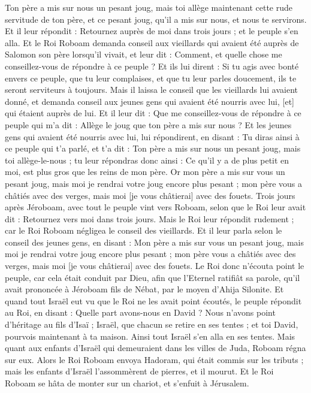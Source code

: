 \begin{multicols}{2}
Ton père a mis sur nous un pesant joug, mais toi allège maintenant cette rude servitude de ton père, et ce pesant joug, qu'il a mis sur nous, et nous te servirons.
Et il leur répondit : Retournez auprès de moi dans trois jours ; et le peuple s'en alla.
Et le Roi Roboam demanda conseil aux vieillards qui avaient été auprès de Salomon son père lorsqu'il vivait, et leur dit : Comment, et quelle chose me conseillez-vous de répondre à ce peuple ?
Et ils lui dirent : Si tu agis avec bonté envers ce peuple, que tu leur complaises, et que tu leur parles doucement, ils te seront serviteurs à toujours.
Mais il laissa le conseil que les vieillards lui avaient donné, et demanda conseil aux jeunes gens qui avaient été nourris avec lui, [et] qui étaient auprès de lui.
Et il leur dit : Que me conseillez-vous de répondre à ce peuple qui m'a dit : Allège le joug que ton père a mis sur nous ?
Et les jeunes gens qui avaient été nourris avec lui, lui répondirent, en disant : Tu diras ainsi à ce peuple qui t'a parlé, et t'a dit : Ton père a mis sur nous un pesant joug, mais toi allège-le-nous ; tu leur répondras donc ainsi : Ce qu'il y a de plus petit en moi, est plus gros que les reins de mon père.
Or mon père a mis sur vous un pesant joug, mais moi je rendrai votre joug encore plus pesant ; mon père vous a châtiés avec des verges, mais moi [je vous châtierai] avec des fouets.
Trois jours après Jéroboam, avec tout le peuple vint vers Roboam, selon que le Roi leur avait dit : Retournez vers moi dans trois jours.
Mais le Roi leur répondit rudement ; car le Roi Roboam négligea le conseil des vieillards.
Et il leur parla selon le conseil des jeunes gens, en disant : Mon père a mis sur vous un pesant joug, mais moi je rendrai votre joug encore plus pesant ; mon père vous a châtiés avec des verges, mais moi [je vous châtierai] avec des fouets.
Le Roi donc n'écouta point le peuple, car cela était conduit par Dieu, afin que l'Eternel ratifiât sa parole, qu'il avait prononcée à Jéroboam fils de Nébat, par le moyen d'Ahija Silonite.
Et quand tout Israël eut vu que le Roi ne les avait point écoutés, le peuple répondit au Roi, en disant : Quelle part avons-nous en David ? Nous n'avons point d'héritage au fils d'Isaï ; Israël, que chacun se retire en ses tentes ; et toi David, pourvois maintenant à ta maison. Ainsi tout Israël s'en alla en ses tentes.
Mais quant aux enfants d'Israël qui demeuraient dans les villes de Juda, Roboam régna sur eux.
Alors le Roi Roboam envoya Hadoram, qui était commis sur les tributs ; mais les enfants d'Israël l'assommèrent de pierres, et il mourut. Et le Roi Roboam se hâta de monter sur un chariot, et s'enfuit à Jérusalem.

\end{multicols}
